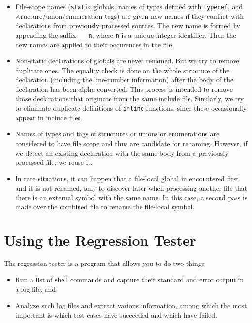 \documentclass{book}
\def\t#1{{\tt #1}}
\begin{document}
\begin{itemize}
\item File-scope names (\t{static} globals, names of types defined with
\t{typedef}, and structure/union/enumeration tags) are given new names if they
conflict with declarations from previously processed sources. The new name is
formed by appending the suffix \t{\_\_\_n}, where \t{n} is a unique integer
identifier. Then the new names are applied to their occurences in the file. 

\item Non-static declarations of globals are never renamed. But we try to
remove duplicate ones. The equality check is done on the whole structure of
the declaration (including the line-number information) after the body of the
declaration has been alpha-converted. This process is intended to remove those
declarations that originate from the same include file. Similarly, we try to
eliminate duplicate definitions of \t{inline} functions, since these
occasionally appear in include files.

\item Names of types and tags of structures or unions or enumerations are
considered to have file scope and thus are candidate for renaming. However, if
we detect an existing declaration with the same body from a previously
processed file, we reuse it.

\item In rare situations, it can happen that a file-local global in
encountered first and it is not renamed, only to discover later when
processing another file that there is an external symbol with the same name.
In this case, a second pass is made over the combined file to rename the
file-local symbol. 
\end{itemize}

\chapter{Using the Regression Tester}\label{ch-regtest}

 The regression tester is a program that allows you to do two things: 
\begin{itemize}
\item Run a list of shell commands and capture their standard and error output
 in a log file, and

\item Analyze such log files and extract various information, among which the
 most important is which test cases have succeeded and which have failed. 
\end{itemize}
\end{document}
